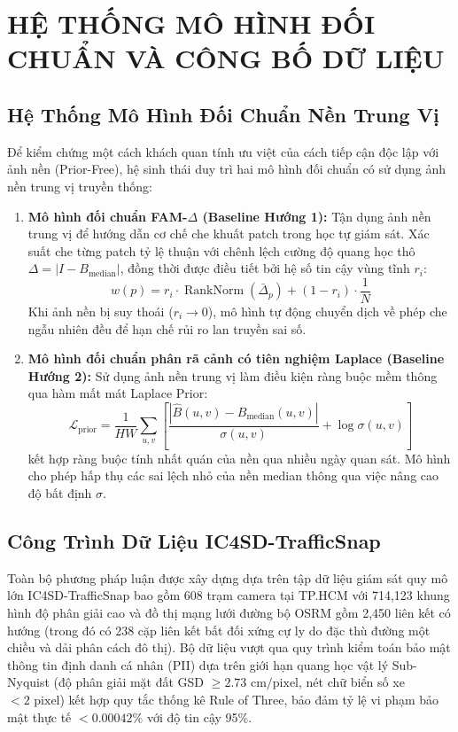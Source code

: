 \documentclass[11pt,a4paper]{article}
\begin{document}
\section{HỆ THỐNG MÔ HÌNH ĐỐI CHUẨN VÀ CÔNG BỐ DỮ LIỆU}

\subsection{Hệ Thống Mô Hình Đối Chuẩn Nền Trung Vị}
Để kiểm chứng một cách khách quan tính ưu việt của cách tiếp cận độc lập với ảnh nền (Prior-Free), hệ sinh thái duy trì hai mô hình đối chuẩn có sử dụng ảnh nền trung vị truyền thống:
\begin{enumerate}
    \item \textbf{Mô hình đối chuẩn FAM-$\Delta$ (Baseline Hướng 1):} Tận dụng ảnh nền trung vị để hướng dẫn cơ chế che khuất patch trong học tự giám sát. Xác suất che từng patch tỷ lệ thuận với chênh lệch cường độ quang học thô $\Delta = |I - B_{\text{median}}|$, đồng thời được điều tiết bởi hệ số tin cậy vùng tĩnh $r_i$:
    \begin{equation}
        w(p) = r_i \cdot \operatorname{RankNorm}(\bar{\Delta}_p) + (1 - r_i) \cdot \frac{1}{N}
    \end{equation}
    Khi ảnh nền bị suy thoái ($r_i \to 0$), mô hình tự động chuyển dịch về phép che ngẫu nhiên đều để hạn chế rủi ro lan truyền sai số.
    \item \textbf{Mô hình đối chuẩn phân rã cảnh có tiên nghiệm Laplace (Baseline Hướng 2):} Sử dụng ảnh nền trung vị làm điều kiện ràng buộc mềm thông qua hàm mất mát Laplace Prior:
    \begin{equation}
        \mathcal{L}_{\text{prior}} = \frac{1}{HW} \sum_{u, v} \left[ \frac{|\hat{B}(u, v) - B_{\text{median}}(u, v)|}{\sigma(u, v)} + \log \sigma(u, v) \right]
    \end{equation}
    kết hợp ràng buộc tính nhất quán của nền qua nhiều ngày quan sát. Mô hình cho phép hấp thụ các sai lệch nhỏ của nền median thông qua việc nâng cao độ bất định $\sigma$.
\end{enumerate}

\subsection{Công Trình Dữ Liệu IC4SD-TrafficSnap}
Toàn bộ phương pháp luận được xây dựng dựa trên tập dữ liệu giám sát quy mô lớn IC4SD-TrafficSnap bao gồm 608 trạm camera tại TP.HCM với 714,123 khung hình độ phân giải cao và đồ thị mạng lưới đường bộ OSRM gồm 2,450 liên kết có hướng (trong đó có 238 cặp liên kết bất đối xứng cự ly do đặc thù đường một chiều và dải phân cách đô thị).
Bộ dữ liệu vượt qua quy trình kiểm toán bảo mật thông tin định danh cá nhân (PII) dựa trên giới hạn quang học vật lý Sub-Nyquist (độ phân giải mặt đất GSD $\ge 2.73\text{ cm/pixel}$, nét chữ biển số xe $< 2\text{ pixel}$) kết hợp quy tắc thống kê Rule of Three, bảo đảm tỷ lệ vi phạm bảo mật thực tế $< 0.00042\%$ với độ tin cậy 95\%.
\end{document}
